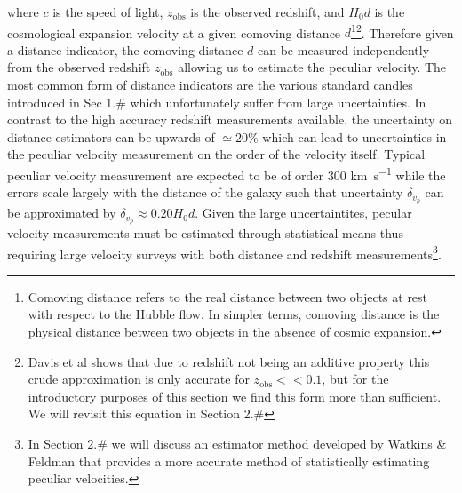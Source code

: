 where \(c\) is the speed of light, \(z_\text{obs}\) is the observed
redshift, and \(H_0d\) is the cosmological expansion velocity at a given
comoving distance
\(d\)\footnote{Comoving distance refers to the real distance between two objects at rest with respect to the Hubble flow. In simpler terms, comoving distance is the physical distance between two objects in the absence of cosmic expansion.}\footnote{Davis et al shows that due to redshift not being an additive property this crude approximation is only accurate for $z_\text{obs} << 0.1$, but for the introductory purposes of this section we find this form more than sufficient. We will revisit this equation in Section 2.#}.
Therefore given a distance indicator, the comoving distance \(d\) can be
measured independently from the observed redshift \(z_\text{obs}\)
allowing us to estimate the peculiar velocity. The most common form of
distance indicators are the various standard candles introduced in Sec
1.\# which unfortunately suffer from large uncertainties. In contrast to
the high accuracy redshift measurements available, the uncertainty on
distance estimators can be upwards of \(\simeq 20\%\) which can lead to
uncertainties in the peculiar velocity measurement on the order of the
velocity itself. Typical peculiar velocity measurement are expected to
be of order \(300\) \si{\km\per\s} while the errors scale largely with
the distance of the galaxy such that uncertainty \(\delta_{v_p}\) can be
approximated by \(\delta_{v_p} \approx 0.20 H_0 d\). Given the large
uncertaintites, pecular velocity measurements must be estimated through
statistical means thus requiring large velocity surveys with both
distance and redshift
measurements\footnote{In Section 2.# we will discuss an estimator method developed by Watkins & Feldman that provides a more accurate method of statistically estimating peculiar velocities.}.
